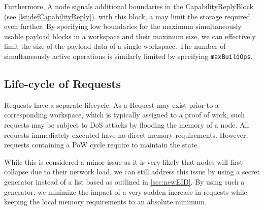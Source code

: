 Furthermore, A node signals additional boundaries in the CapabilityReplyBlock (see \cref{lst:defCapabilityReply}). with this block, a \VortexNode{} may limit the storage required even further. By specifying low boundaries for the maximum simultaneously usable payload blocks in a workspace and their maximum size, we can effectively limit the size of the payload data of a single workspace. The number of simultaneously active operations is similarly limited by specifying \texttt{maxBuildOps}.

\subsection{Life-cycle of Requests}
Requests have a separate lifecycle. As a Request may exist prior to a corresponding workspace, which is typically assigned to a proof of work, such requests may be subject to DoS attacks by flooding the memory of a node. All requests immediately executed have no direct memory requirements. However, requests containing a PoW cycle require to maintain the state. 

While this is considered a minor issue as it is very likely that nodes will first collapse due to their network load, we can still address this issue by using a secret generator instead of a list based as outlined in \cref{sec:newEID}. By using such a generator, we minimize the impact of a very sudden increase in requests while keeping the local memory requirements to an absolute minimum. 


